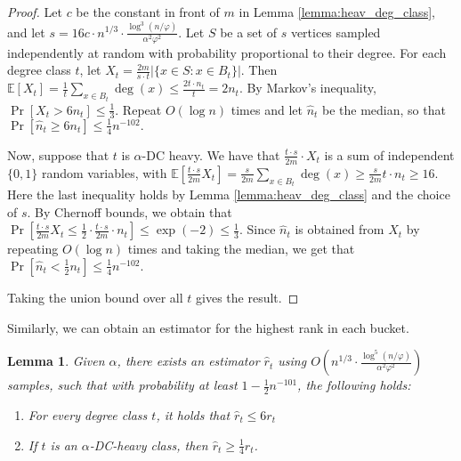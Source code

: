 \documentclass[letterpaper,11pt]{article}
\theoremstyle{plain}
\newtheorem{lemma}[theorem]{Lemma}
\theoremstyle{definition}
\theoremstyle{remark}
\begin{document}
\begin{proof}
Let $c$ be the constant in front of $m$ in Lemma \ref{lemma:heav_deg_class}, and let $s = 16c \cdot n^{1/3} \cdot \frac{\log^3 (n/\varphi)}{\alpha^2 \varphi^2}$. Let $S$ be a set of $s$ vertices sampled independently at random with probability proportional to their degree. For each degree class $t$, let $X_t = \frac{2m}{s \cdot t} |\{x \in S: x \in B_t\}|$. Then $\mathbb{E}[X_t] = \frac{1}{t} \sum_{x \in B_t} \deg(x) \leq \frac{2t\cdot n_t}{t} = 2n_t.$ By Markov's inequality, 
$\Pr[X_t > 6n_t] \leq \frac{1}{3}$. Repeat $O(\log n)$ times and let $\hat{n}_t$ be the median, so that $\Pr[\hat{n}_t \geq 6n_t] \leq \frac{1}{4}n^{-102}.$ 

Now, suppose that $t$ is $\alpha$-DC heavy. We have that $\frac{t \cdot s}{2m} \cdot X_t$ is a sum of independent $\{0,1\}$ random variables, with $\mathbb{E}[\frac{t \cdot s}{2m}X_t] = \frac{s}{2m}\sum_{x \in B_t} \deg(x) \geq \frac{s}{2m}  t\cdot n_t \geq 16$. Here the last inequality holds by Lemma \ref{lemma:heav_deg_class} and the choice of $s$. By Chernoff bounds, we obtain that $\Pr[\frac{t \cdot s}{2m}  X_t \leq \frac{1}{2} \cdot \frac{t \cdot s}{2m}\cdot n_t] \leq \exp{(-2)} \leq \frac{1}{3}$. Since $\hat{n}_t$ is obtained from $X_t$ by repeating $O(\log n)$ times and taking the median, we get that $\Pr[\hat{n}_t < \frac{1}{2}n_t] \leq \frac{1}{4}n^{-102}.$ 

Taking the union bound over all $t$ gives the result. 
\end{proof}
Similarly, we can obtain an estimator for the highest rank in each bucket. 
\begin{lemma}\label{lemma:rhat}
 Given $\alpha$, there exists an estimator $\hat{r}_t$ using  $O\left(n^{1/3} \cdot \frac{\log^5 (n/\varphi)}{\alpha^2 \varphi^2}\right)$  samples, such that with probability at least $1-\frac{1}{2}n^{-101}$, the following holds: 
\begin{enumerate}
    \item For every degree class $t$, it holds that $\hat{r}_t \leq 6r_t$
    \item If $t$ is an $\alpha$-DC-heavy class, then $\hat{r}_t \geq  \frac{1}{4}r_t$. 
 \end{enumerate}
\end{lemma}
\end{document}
